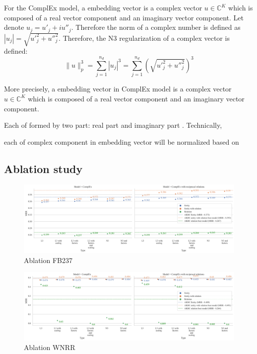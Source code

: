 For the ComplEx model, a embedding vector is a complex vector $u \in \mathbb{C}^K$ which is composed of a real vector component and an imaginary vector component. Let denote $u_j = u'_j + iu''_j$. Therefore the norm of a complex number is defined as $|u_j| = \sqrt{{u'}_j^2 + {u''}_j^2}$. Therefore, the N3 regularization of a complex vector is defined:
\begin{equation}
    \label{eq:final}
    \|u \|^3_p = \sum_{j=1}^{n_d}|u_j|^3 = \sum_{j=1}^{n_d}\left(\sqrt{{u'}_j^2 + {u''}_j^2}\right)^3
\end{equation} 


More precisely, a embedding vector in ComplEx model is a complex vector $u \in \mathbb{C}^K$ which is composed of a real vector component and an imaginary vector component. 

Each of  formed by two part: real part and imaginary part \citet{trouillon2016complex}. Technically, 

each of complex component in embedding vector will be normalized based on 
\newline

\subsection{Ablation study}


\begin{figure}[!htbp]
	\begin{center}
	\includegraphics[width=\linewidth]{Images/Ablation_FB237.png}
	\caption[Ablation FB237]{Ablation FB237}
	\label{fig:Ablation FB237}
	\end{center}
\end{figure}

\begin{figure}[!htbp]
	\begin{center}
	\includegraphics[width=\linewidth]{Images/Ablation_WNRR.png}
	\caption[Ablation WNRR]{Ablation WNRR}
	\label{fig:Ablation WNRR}
	\end{center}
\end{figure}